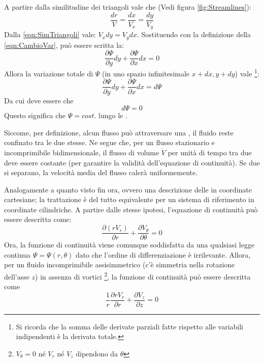 A partire dalla similitudine dei triangoli vale che (Vedi figura \ref{fig:Streamlines}):
\begin{equation}
\frac{dr}{V} = \frac{dx}{V_x} = \frac{dy}{V_y}
\label{eqn:SimTriangoli}
\end{equation}
Dalla \eqref{eqn:SimTriangoli} vale: $V_x dy = V_y dx$.
Sostituendo con la definizione della \eqref{eqn:CambioVar}, può essere scritta la:
\begin{equation}
\frac{\partial \Psi}{\partial y} dy + \frac{\partial \Psi}{\partial x} dx = 0
\end{equation}
Allora la variazione totale di $\Psi$ (in uno spazio infinitesimale $x+dx, y+dy$) vale%
\footnote{Si ricorda che la somma delle derivate parziali fatte rispetto alle variabili indipendenti è la derivata totale.}:
\begin{equation}
\frac{\partial \Psi}{\partial y} dy + \frac{\partial \Psi}{\partial x} dx = d\Psi
\end{equation}
Da cui deve essere che 
\begin{equation}
d\Psi = 0
\end{equation}
Questo significa che $\Psi = cost.$ lungo le .

Siccome, per definizione, alcun flusso può attraversare una , il fluido reste confinato tra le due stesse.
Ne segue che, per un flusso stazionario e incomprimibile bidimensionale, il flusso di volume $\dot{V}$ per unità di tempo tra due  deve essere costante (per garantire la validità dell'equazione di continuità).
Se due  si separano, la velocità media del flusso calerà uniformemente.

Analogamente a quanto visto fin ora, ovvero una descrizione delle  in coordinate cartesiane; la trattazione è del tutto equivalente per un sistema di riferimento in coordinate cilindriche.
A partire dalle stesse ipotesi, l'equazione di continuità può essere descritta come:
\begin{equation}
\frac{\partial (r V_r)}{\partial r} + \frac{\partial V_{\theta}}{\partial \theta} = 0
\end{equation}
Ora, la funzione di continuità viene comunque soddisfatta da una qualsiasi legge continua $\Psi = \Psi(r,\theta)$ dato che l'ordine di differenziazione è irrilevante.
Allora, per un fluido incomprimibile assisimmetrico (c'è simmetria nella rotazione dell'asse $z$) in assenza di vortici%
\footnote{$V_{\theta} = 0$ né $V_r$ né $V_z$ dipendono da $\theta$}, la funzione di continuità può essere descritta come
\begin{equation}
\frac{1}{r}\frac{\partial r V_r}{\partial r} + \frac{\partial V_z}{\partial z}  = 0
\end{equation}

